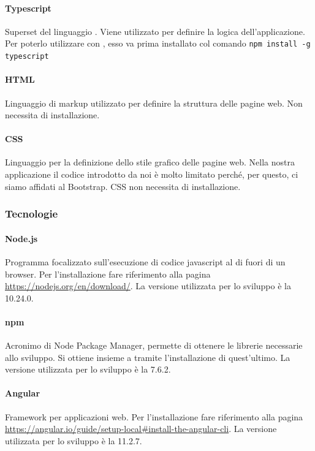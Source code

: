 \paragraph{Typescript}
Superset del linguaggio . Viene utilizzato per definire la logica dell'applicazione. \newline
Per poterlo utilizzare con , esso va prima installato col comando \newline
	\texttt{npm install -g typescript}

\paragraph{HTML}
Linguaggio di markup utilizzato per definire la struttura delle pagine web. Non necessita di installazione.

\paragraph{CSS}
Linguaggio per la definizione dello stile grafico delle pagine web. Nella nostra applicazione il codice  introdotto da noi è molto limitato perché, per questo, ci siamo affidati al  Bootstrap. CSS non necessita di installazione.

\subsubsection{Tecnologie}
\paragraph{Node.js}
Programma focalizzato sull'esecuzione di codice javascript al di fuori di un browser.
Per l'installazione fare riferimento alla pagina \url{https://nodejs.org/en/download/}. La versione utilizzata per lo sviluppo è la 10.24.0.
\paragraph{npm}
Acronimo di Node Package Manager, permette di ottenere le librerie necessarie allo sviluppo.
Si ottiene insieme a  tramite l'installazione di quest'ultimo. La versione utilizzata per lo sviluppo è la 7.6.2.
\paragraph{Angular}
Framework per applicazioni web.
Per l'installazione fare riferimento alla pagina \url{https://angular.io/guide/setup-local#install-the-angular-cli}. La versione utilizzata per lo sviluppo è la 11.2.7.

